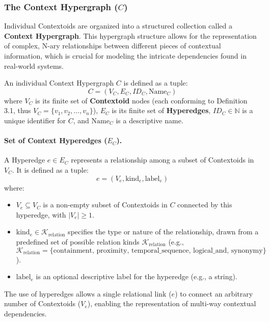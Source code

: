\subsubsection[The Context Hypergraph (C)]{The Context Hypergraph (\(C\))}
    \label{ssec:context_hypergraph_formal}

    Individual Contextoids are organized into a structured collection called a \textbf{Context Hypergraph}. This hypergraph structure allows for the representation of complex, N-ary relationships between different pieces of contextual information, which is crucial for modeling the intricate dependencies found in real-world systems.


    \begin{definition}
    \label{def:context_hypergraph}
    An individual Context Hypergraph \( C \) is defined as a tuple:
    \[ C = (V_C, E_C, ID_C, \text{Name}_C) \]
    where \(V_C\) is its finite set of \textbf{Contextoid} nodes (each conforming to Definition 3.1, thus \( V_C = \{v_1, v_2, \dots, v_n\} \)), \(E_C\) is its finite set of \textbf{Hyperedges}, \(ID_C \in \mathbb{N}\) is a unique identifier for \(C\), and \(\text{Name}_C\) is a descriptive name.
    \end{definition}


    \paragraph*{Set of Context Hyperedges (\(E_C\)).}
    A Hyperedge \( e \in E_C \) represents a relationship among a subset of Contextoids in \(V_C\). It is defined as a tuple:
    \[ e = (V_e, \text{kind}_e, \text{label}_e) \]
    where:
    \begin{itemize} \setlength\itemsep{0em} %
        \item \( V_e \subseteq V_C \) is a non-empty subset of Contextoids in \(C\) connected by this hyperedge, with \(|V_e| \ge 1\).
        \item \( \text{kind}_e \in \mathcal{K}_{\text{relation}} \) specifies the type or nature of the relationship, drawn from a predefined set of possible relation kinds \(\mathcal{K}_{\text{relation}}\) (e.g., \(\mathcal{K}_{\text{relation}} = \{\text{containment, proximity, temporal\_sequence, logical\_and, synonymy}\}\)).
        \item \( \text{label}_e \) is an optional descriptive label for the hyperedge (e.g., a string).
    \end{itemize}
    The use of hyperedges allows a single relational link (\(e\)) to connect an arbitrary number of Contextoids (\(V_e\)), enabling the representation of multi-way contextual dependencies.

